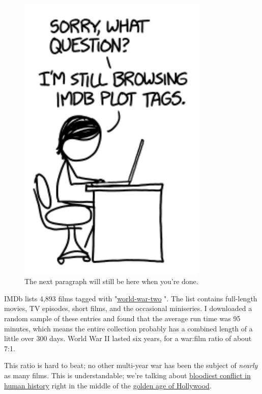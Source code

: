 {\begin{figure}[!htbp]
\centering
\includegraphics[scale=0.5, max width=0.8\textwidth]{imgs/a/100/wait.png}
\caption{The next paragraph will still be here when you're done.}
\end{figure}

{IMDb lists 4,893 films tagged with "\href{http://www.imdb.com/keyword/world-war-two/}{world-war-two} ". The list contains full-length movies, TV episodes, short films, and the occasional miniseries. I downloaded a random sample of these entries and found that the average run time was 95 minutes, which means the entire collection probably has a combined length of a little over 300 days. World War II lasted six years, for a war:film ratio of about 7:1.}

{This ratio is hard to beat; no other multi-year war has been the subject of \emph{nearly} as many films. This is understandable; we're talking about \href{http://necrometrics.com/20c5m.htm\#Second}{bloodiest conflict in human history} right in the middle of the \href{http://en.wikipedia.org/wiki/Classical\_Hollywood\_cinema} {golden age of Hollywood}.}

}
